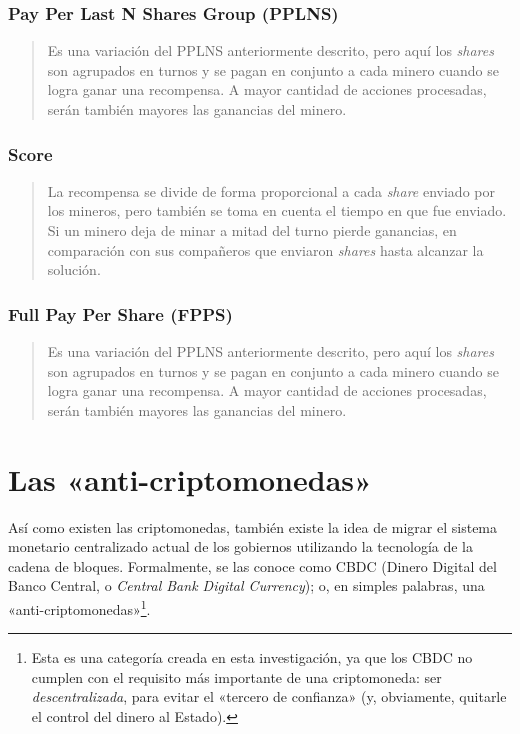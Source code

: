 \documentclass[12pt,a4paper,twoside]{book}
\begin{document}
\subsubsection{Pay Per Last N Shares Group (PPLNS)}
\begin{quotation}
Es una variación del PPLNS anteriormente descrito, pero aquí los \textit{shares} son agrupados en turnos y se pagan en conjunto a cada minero cuando se logra ganar una recompensa. A mayor cantidad de acciones procesadas, serán también mayores las ganancias del minero. \cite{shares}
\end{quotation}

\subsubsection{Score}
\begin{quotation}
La recompensa se divide de forma proporcional a cada \textit{share} enviado por los mineros, pero también se toma en cuenta el tiempo en que fue enviado. Si un minero deja de minar a mitad del turno pierde ganancias, en comparación con sus compañeros que enviaron \textit{shares} hasta alcanzar la solución. \cite{shares}
\end{quotation}

\subsubsection{Full Pay Per Share (FPPS)}
\begin{quotation}
Es una variación del PPLNS anteriormente descrito, pero aquí los \textit{shares} son agrupados en turnos y se pagan en conjunto a cada minero cuando se logra ganar una recompensa. A mayor cantidad de acciones procesadas, serán también mayores las ganancias del minero. \cite{shares}
\end{quotation}

\section{Las «anti-criptomonedas»}
Así como existen las criptomonedas, también existe la idea de migrar el sistema monetario centralizado actual de los gobiernos utilizando la tecnología de la cadena de bloques. Formalmente, se las conoce como CBDC (Dinero Digital del Banco Central, o \textit{Central Bank Digital Currency}); o, en simples palabras, una  «anti-criptomonedas»\footnote{Esta es una categoría creada en esta investigación, ya que los CBDC no cumplen con el requisito más importante de una criptomoneda: ser \textit{descentralizada}, para evitar el «tercero de confianza» (y, obviamente, quitarle el control del dinero al Estado).}.
\end{document}
